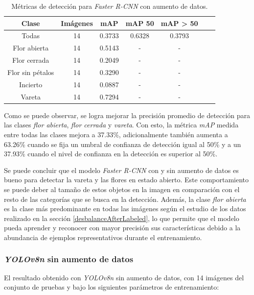 \begin{table}[h]
	\centering
	\caption{Métricas de detección para \textit{Faster R-CNN} con aumento de datos.}
	\begin{tabular}{c c c c c c c}    
		\toprule
		\textbf{Clase}&\textbf{Imágenes}&\textbf{mAP}&\textbf{mAP 50}&\textbf{mAP > 50}\\
		\midrule
		Todas & 14 & 0.3733 & 0.6328 & 0.3793\\
		Flor abierta & 14 & 0.5143 & - & - \\
		Flor cerrada & 14 & 0.2049 & - & - \\
		Flor sin pétalos & 14 & 0.3290 & - & - \\
		Incierto & 14 & 0.0887 & - & - \\
		Vareta & 14 & 0.7294 & - & - \\		
		\bottomrule
		\hline
	\end{tabular}
	\label{tab:resultadosFasterConAug}
\end{table}
\newpage
Como se puede observar, se logra mejorar la precisión promedio de detección para las clases \textit{flor abierta}, \textit{flor cerrada} y \textit{vareta}. Con esto, la métrica \textit{mAP} medida entre todas las clases mejora a 37.33\%, adicionalmente también aumenta a 63.26\% cuando se fija un umbral de confianza de detección igual al 50\% y a un 37.93\% cuando el nivel de confianza en la detección es superior al 50\%.

Se puede concluir que el modelo \textit{Faster R-CNN} con y sin aumento de datos es bueno para detectar la vareta y las flores en estado abierto. Este comportamiento se puede deber al tamaño de estos objetos en la imagen en comparación con el resto de las categorías que se busca en la detección. Además, la clase \textit{flor abierta} es la clase más predominante en todas las imágenes según el estudio de los datos realizado en la sección \ref{desbalanceAfterLabeled}, lo que permite que el modelo pueda aprender y reconocer con mayor precisión sus características debido a la abundancia de ejemplos representativos durante el entrenamiento.

\subsubsection{\textit{YOLOv8n} sin aumento de datos}

El resultado obtenido con \textit{YOLOv8n} sin aumento de datos, con 14 imágenes del conjunto de pruebas y bajo los siguientes parámetros de entrenamiento:


